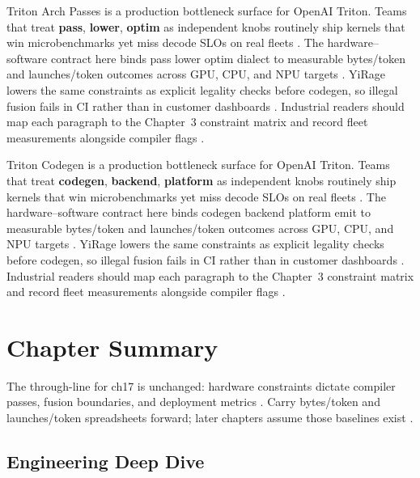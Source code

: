 Triton Arch Passes is a production bottleneck surface for OpenAI Triton. Teams that treat \textbf{pass}, \textbf{lower}, \textbf{optim} as independent knobs routinely ship kernels that win microbenchmarks yet miss decode SLOs on real fleets \citep{nvidia2022hopper,amd2024aie}. The hardware--software contract here binds pass lower optim dialect to measurable bytes/token and launches/token outcomes across GPU, CPU, and NPU targets \citep{semianalysis2024tma,dlbook}. YiRage lowers the same constraints as explicit legality checks before codegen, so illegal fusion fails in CI rather than in customer dashboards \citep{amd2024xdna,dao2022flashattention}. Industrial readers should map each paragraph to the Chapter~3 constraint matrix and record fleet measurements alongside compiler flags \citep{amd2024aie,kwon2023vllm}.

Triton Codegen is a production bottleneck surface for OpenAI Triton. Teams that treat \textbf{codegen}, \textbf{backend}, \textbf{platform} as independent knobs routinely ship kernels that win microbenchmarks yet miss decode SLOs on real fleets \citep{semianalysis2024tma,dlbook}. The hardware--software contract here binds codegen backend platform emit to measurable bytes/token and launches/token outcomes across GPU, CPU, and NPU targets \citep{amd2024xdna,dao2022flashattention}. YiRage lowers the same constraints as explicit legality checks before codegen, so illegal fusion fails in CI rather than in customer dashboards \citep{amd2024aie,kwon2023vllm}. Industrial readers should map each paragraph to the Chapter~3 constraint matrix and record fleet measurements alongside compiler flags \citep{dlbook,nvidia2024cudagraphs}.

\section{Chapter Summary}
\label{sec:ch17_summary}

The through-line for ch17 is unchanged: hardware constraints dictate compiler passes, fusion boundaries, and deployment metrics \citep{memoryfloor2026,amd2024xdna}. Carry bytes/token and launches/token spreadsheets forward; later chapters assume those baselines exist \citep{semianalysis2024tma,dlbook}.


\subsection{Engineering Deep Dive}
\label{sec:ch17_deep_dive}

